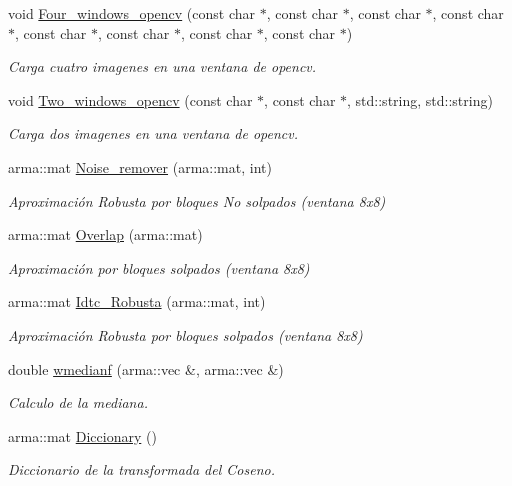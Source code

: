 \begin{DoxyCompactItemize}
\item 
void \hyperlink{classImage_a359478a1e745b5da4ce47105ef0be14a}{Four\_\-windows\_\-opencv} (const char $\ast$, const char $\ast$, const char $\ast$, const char $\ast$, const char $\ast$, const char $\ast$, const char $\ast$, const char $\ast$)
\begin{DoxyCompactList}\small\item\em Carga cuatro imagenes en una ventana de opencv. \end{DoxyCompactList}\item 
void \hyperlink{classImage_ab88eac57a583bac4fe326477d33d57b0}{Two\_\-windows\_\-opencv} (const char $\ast$, const char $\ast$, std::string, std::string)
\begin{DoxyCompactList}\small\item\em Carga dos imagenes en una ventana de opencv. \end{DoxyCompactList}\item 
arma::mat \hyperlink{classImage_ae20915262dc4e5f323ab1ee1144e8360}{Noise\_\-remover} (arma::mat, int)
\begin{DoxyCompactList}\small\item\em Aproximación Robusta por bloques No solpados (ventana 8x8) \end{DoxyCompactList}\item 
arma::mat \hyperlink{classImage_a8c565bce437181ecac5b042055c23919}{Overlap} (arma::mat)
\begin{DoxyCompactList}\small\item\em Aproximación por bloques solpados (ventana 8x8) \end{DoxyCompactList}\item 
arma::mat \hyperlink{classImage_ac18f2333604b1fff1c27ba8463fce0c1}{Idtc\_\-Robusta} (arma::mat, int)
\begin{DoxyCompactList}\small\item\em Aproximación Robusta por bloques solpados (ventana 8x8) \end{DoxyCompactList}\item 
double \hyperlink{classImage_a9c1e1c0c5b6892b39048d05a592569ad}{wmedianf} (arma::vec \&, arma::vec \&)
\begin{DoxyCompactList}\small\item\em Calculo de la mediana. \end{DoxyCompactList}\item 
arma::mat \hyperlink{classImage_a199f777054311b461b04b2a55d6a6697}{Diccionary} ()
\begin{DoxyCompactList}\small\item\em Diccionario de la transformada del Coseno. \end{DoxyCompactList}\item 

\end{DoxyCompactItemize}
